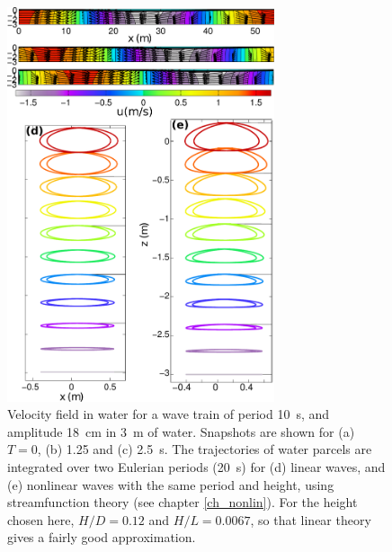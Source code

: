 \begin{figure}
\centerline{\includegraphics[width=0.7\textwidth]{FIGS_CH_AIRY/10sec_3mdepth_puv_drift.pdf}}
  \caption{Velocity field in water for a wave train of period 10~s, and amplitude 18~cm in 3~m of water. Snapshots are shown for 
(a) $T=0$, (b) 1.25 and (c) 2.5~s. 
The trajectories of water parcels are integrated over two Eulerian periods  (20~s) for (d) linear waves, and (e) nonlinear waves with the 
same period and height, using streamfunction theory (see chapter \ref{ch_nonlin}). For the height chosen here, $H/D=0.12$ and $H/L=0.0067$, so that 
linear theory gives a  fairly good approximation. }
\label{fig:uv2}
\end{figure}



